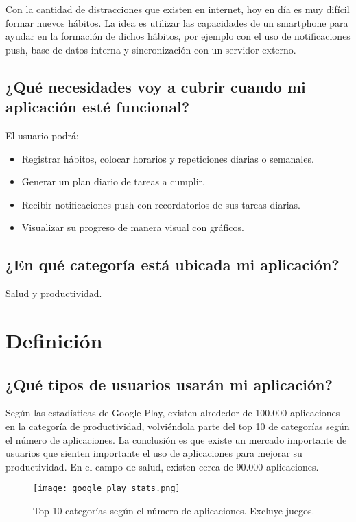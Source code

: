 \documentclass[11pt]{scrartcl} %
\begin{document}
Con la cantidad de distracciones que existen en internet, hoy en día es muy difícil formar nuevos hábitos. La idea es utilizar las capacidades de un smartphone para ayudar en la formación de dichos hábitos, por ejemplo con el uso de notificaciones push, base de datos interna y sincronización con un servidor externo.

\subsection{¿Qué necesidades voy a cubrir cuando mi aplicación esté funcional?}

El usuario podrá:
\begin{itemize}
	\item Registrar hábitos, colocar horarios y repeticiones diarias o semanales.
	\item Generar un plan diario de tareas a cumplir.
	\item Recibir notificaciones push con recordatorios de sus tareas diarias.
	\item Visualizar su progreso de manera visual con gráficos.
\end{itemize}

\subsection{¿En qué categoría está ubicada mi aplicación?}

Salud y productividad.

\section{Definición}

\subsection{¿Qué tipos de usuarios usarán mi aplicación?}

Según las estadísticas de Google Play, existen alrededor de 100.000 aplicaciones en la categoría de productividad, volviéndola parte del top 10 de categorías según el número de aplicaciones. La conclusión es que existe un mercado importante de usuarios que sienten importante el uso de aplicaciones para mejorar su productividad. En el campo de salud, existen cerca de 90.000 aplicaciones.

\begin{figure}[h] %
	\centering
	\texttt{[image: google\_play\_stats.png]} %
	\caption{Top 10 categorías según el número de aplicaciones. Excluye juegos.}
\end{figure}
\end{document}

